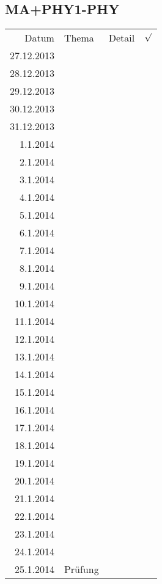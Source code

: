 \subsection{MA+PHY1-PHY}
\begin{tabular}{r l p{} l}
\rowcolor{lgray} Datum       & Thema         & Detail & $\surd$ \\
\rowcolor{white}  27.12.2013 &               &  &  \\
\rowcolor{lgray}  28.12.2013 &               &  &  \\
\rowcolor{white}  29.12.2013 &               &  &  \\
\rowcolor{lgray}  30.12.2013 &               &  &  \\
\rowcolor{white}  31.12.2013 &               &  &  \\
\rowcolor{lgray}    1.1.2014 &               &  &  \\
\rowcolor{white}    2.1.2014 &               &  &  \\
\rowcolor{lgray}    3.1.2014 &               &  &  \\
\rowcolor{white}    4.1.2014 &               &  &  \\
\rowcolor{lgray}    5.1.2014 &               &  &  \\
\rowcolor{white}    6.1.2014 &               &  &  \\
\rowcolor{lgray}    7.1.2014 &               &  &  \\
\rowcolor{white}    8.1.2014 &               &  &  \\
\rowcolor{lgray}    9.1.2014 &               &  &  \\
\rowcolor{white}   10.1.2014 &               &  &  \\
\rowcolor{lgray}   11.1.2014 &               &  &  \\
\rowcolor{white}   12.1.2014 &               &  &  \\
\rowcolor{lgray}   13.1.2014 &               &  &  \\
\rowcolor{white}   14.1.2014 &               &  &  \\
\rowcolor{lgray}   15.1.2014 &               &  &  \\
\rowcolor{white}   16.1.2014 &               &  &  \\
\rowcolor{lgray}   17.1.2014 &               &  &  \\
\rowcolor{white}   18.1.2014 &               &  &  \\
\rowcolor{lgray}   19.1.2014 &               &  &  \\
\rowcolor{white}   20.1.2014 &               &  &  \\
\rowcolor{lgray}   21.1.2014 &               &  &  \\
\rowcolor{white}   22.1.2014 &               &  &  \\
\rowcolor{lgray}   23.1.2014 &               &  &  \\
\rowcolor{white}   24.1.2014 &               &  &  \\
\rowcolor{lgray}   25.1.2014 & Prüfung       &  &  \\
\end{tabular}

